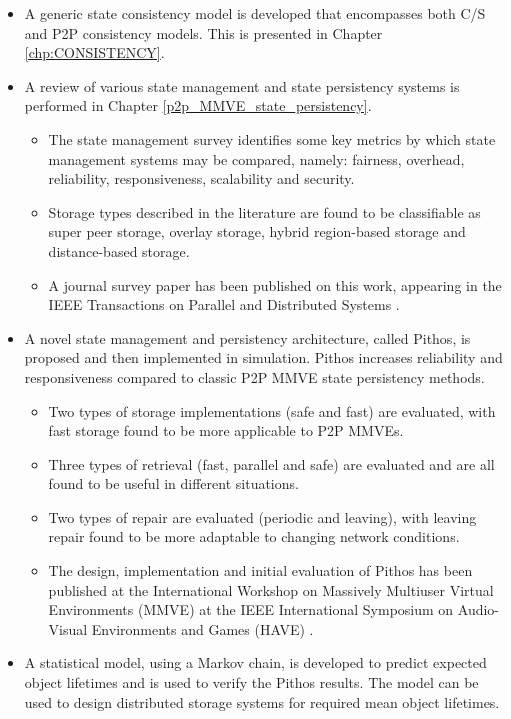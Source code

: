 \begin{itemize}
\item A generic state consistency model is developed that encompasses both C/S and P2P consistency models. This is presented in Chapter \ref{chp:CONSISTENCY}.

\item A review of various state management and state persistency systems is performed in Chapter \ref{p2p_MMVE_state_persistency}.
    \begin{itemize}
    \item The state management survey identifies some key metrics by which state management systems may be compared, namely: fairness, overhead, reliability, responsiveness, scalability and security.
    \item Storage types described in the literature are found to be classifiable as super peer storage, overlay storage, hybrid region-based storage and distance-based storage.
    \item A journal survey paper has been published on this work, appearing in the IEEE Transactions on Parallel and Distributed Systems \cite{gilmore_p2p_mmog_state_persistency}.
    \end{itemize}

\item A novel state management and persistency architecture, called Pithos, is proposed and then implemented in simulation. Pithos increases reliability and responsiveness compared to classic P2P MMVE state persistency methods.
    \begin{itemize}
    \item Two types of storage implementations (safe and fast) are evaluated, with fast storage found to be more applicable to P2P MMVEs.
    \item Three types of retrieval (fast, parallel and safe) are evaluated and are all found to be useful in different situations.
    \item Two types of repair are evaluated (periodic and leaving), with leaving repair found to be more adaptable to changing network conditions.
    \item The design, implementation and initial evaluation of Pithos has been published at the International Workshop on Massively Multiuser Virtual Environments (MMVE) at the IEEE International Symposium on Audio-Visual Environments and Games (HAVE) \cite{Pithos_mmve_2011}.
    \end{itemize}

\item A statistical model, using a Markov chain, is developed to predict expected object lifetimes and is used to verify the Pithos results. The model can be used to design distributed storage systems for required mean object lifetimes.
\end{itemize}

